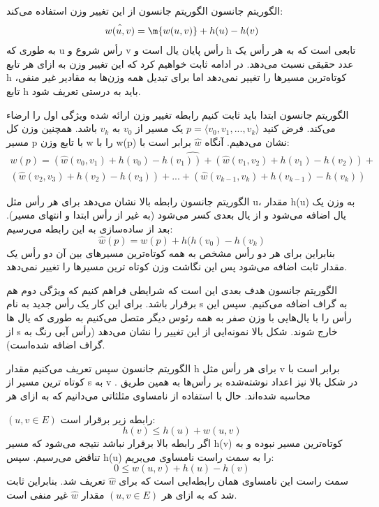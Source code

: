 \begin{itemframe}{الگوریتم جانسون}
\itm
الگوریتم جانسون از این تغییر وزن استفاده می‌کند:
\begin{align*}
\hat{w(u, v)} = \m{w(u, v)} + h(u) - h(v)
\end{align*}
\itm
به طوری که u رأس شروع و v رأس پایان یال است و h تابعی است که به هر رأس یک عدد حقیقی نسبت می‌دهد.
\itm
در ادامه ثابت خواهیم کرد که این تغییر وزن به ازای هر تابع h کوتاه‌ترین مسیرها را تغییر نمی‌دهد اما برای تبدیل همه وزن‌ها به مقادیر غیر منفی، تابع h باید به درستی تعریف شود.
\end{itemframe}


\begin{itemframe}{الگوریتم جانسون}
\itm
ابتدا باید ثابت ‌کنیم رابطه تغییر وزن ارائه شده ویژگی اول را ارضاء می‌کند.
\itm
فرض کنید
$ p= \langle v_0, v_1, ..., v_k \rangle$
یک مسیر از
$v_0$
به
$v_k$
باشد. همچنین وزن کل مسیر p با تابع وزن w را با  w(p) نشان می‌دهیم. آنگاه
$\hat{w}$
برابر است با:
\begin{align*}
\hat{w(p)= (\hat{w}(v_0, v_1) + h(v_0) -  h(v_1)) + (\hat{w}(v_1, v_2) + h(v_1) -  h(v_2)) + } \\
(\hat{w}(v_2, v_3) + h(v_2) -  h(v_3)) + ... + (\hat{w}(v_{k-1}, v_k) + h(v_{k-1}) -  h(v_k))
\end{align*}

\end{itemframe}


\begin{itemframe}{الگوریتم جانسون}
\itm
رابطه بالا نشان می‌دهد برای هر رأس مثل u، مقدار h(u) به وزن یک یال اضافه می‌شود و از یال بعدی کسر می‌شود (به غیر از رأس ابتدا و انتهای مسیر). بعد از ساده‌سازی به این رابطه می‌رسیم:
$$\hat{w}(p)=w(p) + h(h(v_0) - h(v_k)$$
\itm
بنابراین برای هر دو رأس مشخص به همه کوتاه‌ترین مسیرهای بین آن دو رأس یک مقدار ثابت اضافه می‌شود پس این نگاشت وزن کوتاه ترین مسیرها را تغییر نمی‌دهد.
\end{itemframe}

\begin{itemframe}{الگوریتم جانسون}
\itm
هدف بعدی این است که شرایطی فراهم کنیم که ویژگی دوم هم برقرار باشد. برای این کار یک رأس جدید به نام s به گراف اضافه می‌کنیم. سپس این رأس را با یال‌هایی با وزن صفر به همه رئوس دیگر متصل می‌کنیم به طوری که یال ‌ها از s خارج شوند.
شکل بالا نمونه‌ایی از این تغییر را نشان می‌دهد (رأس آبی رنگ به گراف اضافه شده‌است).
\end{itemframe}


\begin{itemframe}{الگوریتم جانسون}
\itm
سپس تعریف می‌کنیم مقدار h برای هر رأس مثل v برابر است با کوتاه ترین مسیر از s به v . در شکل بالا نیز اعداد نوشته‌شده بر رأس‌ها به همین طریق محاسبه شده‌اند.
\itm
حال با استفاده از نامساوی مثلثاتی می‌دانیم که به ازای هر

$(u, v \in E)$
رابطه زیر برقرار است:
$$
h(v) \leqslant h(u)+w(u, v)
$$
\itm
اگر رابطه بالا برقرار نباشد نتیجه می‌شود که مسیر h(v) کوتاه‌ترین مسیر نبوده و به تناقض می‌رسیم.
\itm
سپس h(u) را به سمت راست نامساوی می‌بریم:
$$
0\leqslant w(u, v) + h(u) - h(v)
$$
\itm
سمت راست این نامساوی همان رابطه‌ایی است که برای $\hat{w}$ تعریف شد. بنابراین ثابت شد که به ازای هر
$(u, v \in E)$
مقدار $\hat{w}$ غیر منفی است.
\end{itemframe}


